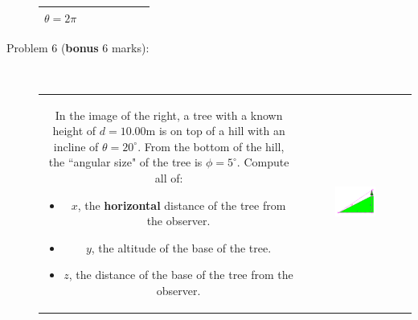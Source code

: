 \documentclass{article}
\begin{document}
\begin{description}
\begin{tabular}{|c||c|c||c|c||c|c|}
\hline
\(\theta = 2\pi\)                &                       &                       &                         &                          &                       &                         \\
\hline
\end{tabular}
\item[Problem 6 ({\bf bonus} 6 marks):] ~~~~ \\   
\begin{tabular}{cc}
\parbox{0.5\textwidth}{
In the image of the right, a tree with a known height of \(d = 10.00\text{m}\) is on top of a hill with an incline of \(\theta = 20^\circ\). From the bottom of the hill, the ``angular size" of the tree is \(\phi = 5^\circ\). Compute all of:
\begin{itemize}
\item \(x\), the {\bf horizontal} distance of the tree from the observer. 
\item \(y\), the altitude of the base of the tree.
\item \(z\), the distance of the base of the tree from the observer.
\end{itemize}
} & \parbox{0.4\textwidth}{
\includegraphics[width = 0.4\textwidth]{tree_on_a_hill}
}
\end{tabular}
\end{description}
\end{document}
